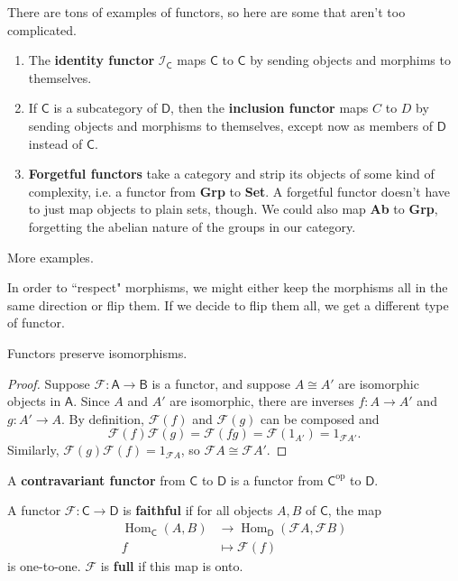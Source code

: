 \documentclass[10pt]{report}
\newcommand{\cat}[1]{\mathsf{#1}}
\DeclareMathOperator{\hh}{Hom}
\DeclareMathOperator{\op}{op}
\begin{document}
There are tons of examples of functors, so here are some that aren't too complicated.
\begin{enumerate}
	\item The \textbf{identity functor} $\mathcal{I}_{\cat{C}}$ maps $\cat{C}$ to $\cat{C}$ by sending objects and morphims to themselves.
	\item If $\cat{C}$ is a subcategory of $\cat{D}$, then the \textbf{inclusion functor} maps $C$ to $D$ by sending objects and morphisms to themselves, except now as members of $\cat{D}$ instead of $\cat{C}$.
	\item \textbf{Forgetful functors} take a category and strip its objects of some kind of complexity, i.e. a functor from \textbf{Grp} to \textbf{Set}. A forgetful functor doesn't have to just map objects to plain sets, though. We could also map \textbf{Ab} to \textbf{Grp}, forgetting the abelian nature of the groups in our category.
\end{enumerate}

{\color{red}More examples.}

In order to ``respect" morphisms, we might either keep the morphisms all in the same direction or flip them. If we decide to flip them all, we get a different type of functor.

\begin{prop}
Functors preserve isomorphisms.
\end{prop}
\begin{proof}
	Suppose $\mathcal{F}:\cat{A}\to \cat{B}$ is a functor, and suppose $A \cong A'$ are isomorphic objects in $\cat{A}$. Since $A$ and $A'$ are isomorphic, there are inverses $f:A\to A'$ and $g:A'\to A$. By definition, $\mathcal{F}(f)$ and $\mathcal{F}(g)$ can be composed and
	\[
		\mathcal{F}(f)\mathcal{F}(g) = \mathcal{F}(fg) = \mathcal{F}(1_{A'}) = 1_{\mathcal{F}A'}.
	\] Similarly, $\mathcal{F}(g)\mathcal{F}(f)=1_{\mathcal{F}A}$, so $\mathcal{F}A \cong \mathcal{F}A'$.
\end{proof}

\begin{defn}
	A \textbf{contravariant functor} from $\cat{C}$ to $\cat{D}$ is a functor from $\cat{C}^{\op}$ to $\cat{D}$.
\end{defn}

\begin{defn}
A functor $\mathcal{F}:\cat{C}\to \cat{D}$ is \textbf{faithful} if for all objects $A,B$ of $\cat{C}$, the map
\begin{align*}
	\hh_{\cat{C}}(A,B) &\to \hh_{\cat{D}}(\mathcal{F}A, \mathcal{F}B) \\
	f &\mapsto \mathcal{F}(f)
\end{align*} is one-to-one. $\mathcal{F}$ is \textbf{full} if this map is onto.
\end{defn}
\end{document}
